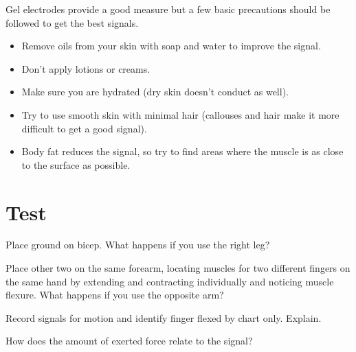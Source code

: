 Gel electrodes provide a good measure but a few basic precautions should be followed to get the best signals.

\begin{itemize}
  \item Remove oils from your skin with soap and water to improve the signal.
  \item Don't apply lotions or creams.
  \item Make sure you are hydrated (dry skin doesn't conduct as well).
  \item Try to use smooth skin with minimal hair (callouses and hair make it more difficult to get a good signal).
  \item Body fat reduces the signal, so try to find areas where the muscle is as close to the surface as possible.
\end{itemize} 



\section{Test}

Place ground on bicep.  What happens if you use the right leg?

Place other two on the same forearm, locating muscles for two different fingers on the same hand by extending and contracting individually and noticing muscle flexure.  What happens if you use the opposite arm?

Record signals for motion and identify finger flexed by chart only.  Explain.

How does the amount of exerted force relate to the signal?